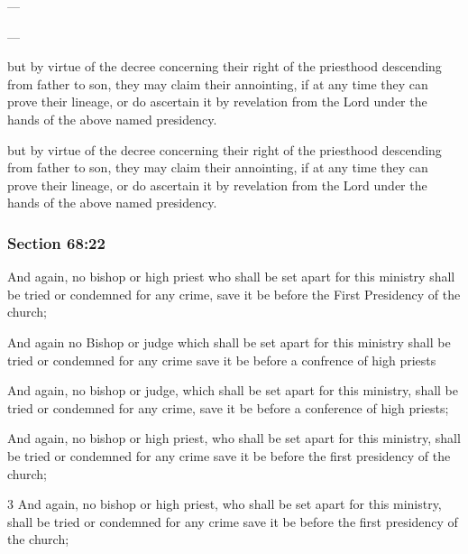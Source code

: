 		\begin{framed}
		\scriptsize
			\begin{compactdesc}
				\item[JSP] ---
				\item[EMS] ---
				\item[EMS-R] but by virtue of the decree concerning their right of the priesthood descending from father to son, they may claim their annointing, if at any time they can prove their lineage, or do ascertain it by revelation from the Lord under the hands of the above named presidency.
				\item[DC 1835] but by virtue of the decree concerning their right of the priesthood descending from father to son, they may claim their annointing, if at any time they can prove their lineage, or do ascertain it by revelation from the Lord under the hands of the above named presidency.
			\end{compactdesc}
		\end{framed}

	\subsubsection{Section 68:22} %
		\label{DC68-22}

		And again, no bishop or high priest who shall be set apart for this ministry shall be tried or condemned for any crime, save it be before the First Presidency of the church;

		\begin{framed}
		\scriptsize
			\begin{compactdesc}
				\item[JSP] And again no Bishop or judge which shall be set apart for this ministry shall be tried or condemned for any crime save it be before a confrence of high priests
				\item[EMS] And again, no bishop or judge, which shall be set apart for this ministry, shall be tried or condemned for any crime, save it be before a conference of high priests;
				\item[EMS-R] And again, no bishop or high priest, who shall be set apart for this ministry, shall be tried or condemned for any crime save it be before the first presidency of the church;
				\item[DC 1835] 3 And again, no bishop or high priest, who shall be set apart for this ministry, shall be tried or condemned for any crime save it be before the first presidency of the church;
			\end{compactdesc}
		\end{framed}

